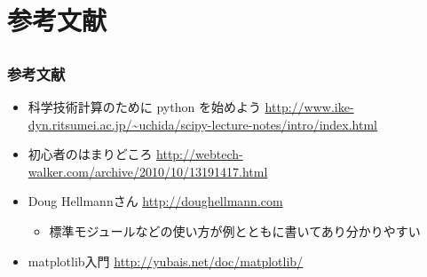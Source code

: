\section{参考文献}

\subsection*{\redm\whiteb\greenb}
\begin{frame}[t]
\frametitle{参考文献}
\begin{itemize}
\item 科学技術計算のために python を始めよう
  \url{http://www.ike-dyn.ritsumei.ac.jp/~uchida/scipy-lecture-notes/intro/index.html}
\item 初心者のはまりどころ \url{http://webtech-walker.com/archive/2010/10/13191417.html}
\item Doug Hellmannさん \url{http://doughellmann.com}
  \begin{itemize}
  \item 標準モジュールなどの使い方が例とともに書いてあり分かりやすい
  \end{itemize}
\item matplotlib入門 \url{http://yubais.net/doc/matplotlib/}
\end{itemize}
\end{frame}


